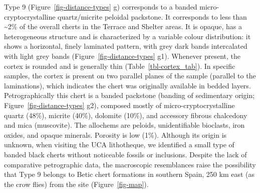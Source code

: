 \documentclass[
  a4paper,
  DIV=11,
  numbers=noendperiod]{scrreprt}
\begin{document}
Type 9 (Figure~\ref{fig-distance-types} g) corresponds to a banded
micro-cryptocrystalline quartz/micrite peloidal packstone. It
corresponds to less than \textasciitilde2\% of the overall cherts in the
Terrace and Shelter areas. It is opaque, has a heterogeneous structure
and is characterized by a variable colour distribution: it shows a
horizontal, finely laminated pattern, with grey dark bands intercalated
with light grey bands (Figure~\ref{fig-distance-types} g1). Whenever
present, the cortex is rounded and is generally thin
(Table~\ref{tbl-cortex_tab}). In specific samples, the cortex is present
on two parallel planes of the sample (parallel to the laminations),
which indicates the chert was originally available in bedded layers.
Petrographically this chert is a banded packstone (banding of
sedimentary origin; Figure~\ref{fig-distance-types} g2), composed mostly
of micro-cryptocrystalline quartz (48\%), micrite (40\%), dolomite
(10\%), and accessory fibrous chalcedony and mica (muscovite). The
allochems are peloids, unidentifiable bioclasts, iron oxides, and opaque
minerals. Porosity is low (1\%). Although its origin is unknown, when
visiting the UCA lithotheque, we identified a small type of banded black
cherts without noticeable fossils or inclusions. Despite the lack of
comparative petrographic data, the macroscopic resemblances raise the
possibility that Type 9 belongs to Betic chert formations in southern
Spain, 250 km east (as the crow flies) from the site
(Figure~\ref{fig-map}).
\end{document}
